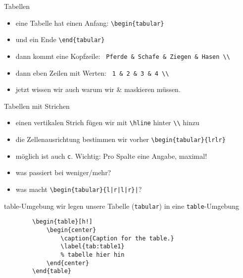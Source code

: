 \begin{frame}[fragile]{Tabellen}
    \begin{itemize}[<+->]
        \item eine Tabelle hat einen Anfang: \lstinline|\begin{tabular}|
        \item und ein Ende \lstinline|\end{tabular}|
        \item dann kommt eine Kopfzeile: \lstinline| Pferde & Schafe & Ziegen & Hasen \\|
        \item dann eben Zeilen mit Werten: \lstinline| 1 & 2 & 3 & 4 \\ |
        \item jetzt wissen wir auch warum wir \& maskieren müssen.
    \end{itemize}
\end{frame}

\begin{frame}[fragile]{Tabellen mit Strichen}
    \begin{itemize}[<+->]
        \item einen vertikalen Strich fügen wir mit \lstinline|\hline| hinter \lstinline|\\| hinzu
        \item die Zellenausrichtung bestimmen wir vorher \lstinline|\begin{tabular}{lrlr}|
        \item möglich ist auch \texttt{c}. Wichtig: Pro Spalte eine Angabe, maximal!
        \item was passiert bei weniger/mehr?
        \item was macht \lstinline!\begin{tabular}{l|r|l|r}|!?
    \end{itemize}
\end{frame}

\begin{frame}[fragile]{table-Umgebung}
    wir legen unsere Tabelle (\texttt{tabular}) in eine \texttt{table}-Umgebung
        \begin{lstlisting}
        \begin{table}[h!]
            \begin{center}
                \caption{Caption for the table.}
                \label{tab:table1}
                % tabelle hier hin
            \end{center}
        \end{table}
        \end{lstlisting}
\end{frame}

